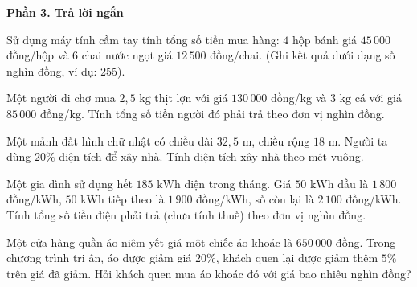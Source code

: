 \textbf{Phần 3. Trả lời ngắn}

\begin{ex} %
Sử dụng máy tính cầm tay tính tổng số tiền mua hàng: $4$ hộp bánh giá $45\,000$ đồng/hộp và $6$ chai nước ngọt giá $12\,500$ đồng/chai. (Ghi kết quả dưới dạng số nghìn đồng, ví dụ: 255).
\end{ex}

\begin{ex} %
Một người đi chợ mua $2{,}5\text{ kg}$ thịt lợn với giá $130\,000$ đồng/kg và $3\text{ kg}$ cá với giá $85\,000$ đồng/kg. Tính tổng số tiền người đó phải trả theo đơn vị nghìn đồng.
\end{ex}

\begin{ex} %
Một mảnh đất hình chữ nhật có chiều dài $32{,}5\text{ m}$, chiều rộng $18\text{ m}$. Người ta dùng $20\%$ diện tích để xây nhà. Tính diện tích xây nhà theo mét vuông.
\end{ex}

\begin{ex} %
Một gia đình sử dụng hết $185\text{ kWh}$ điện trong tháng. Giá $50\text{ kWh}$ đầu là $1\,800$ đồng/kWh, $50\text{ kWh}$ tiếp theo là $1\,900$ đồng/kWh, số còn lại là $2\,100$ đồng/kWh. Tính tổng số tiền điện phải trả (chưa tính thuế) theo đơn vị nghìn đồng.
\end{ex}

\begin{ex} %
Một cửa hàng quần áo niêm yết giá một chiếc áo khoác là $650\,000$ đồng. Trong chương trình tri ân, áo được giảm giá $20\%$, khách quen lại được giảm thêm $5\%$ trên giá đã giảm. Hỏi khách quen mua áo khoác đó với giá bao nhiêu nghìn đồng?
\end{ex}

